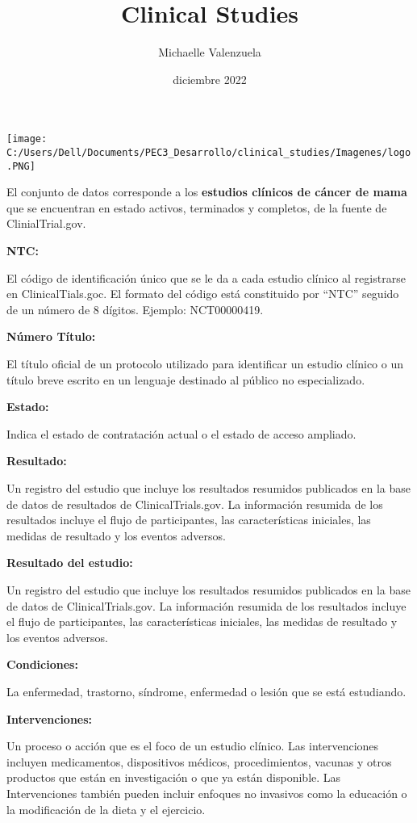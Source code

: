 \documentclass[
]{article}
\title{Clinical Studies}
\author{Michaelle Valenzuela}
\date{diciembre 2022}
\begin{document}
\maketitle

\texttt{[image: C:/Users/Dell/Documents/PEC3\_Desarrollo/clinical\_studies/Imagenes/logo.PNG]}

El conjunto de datos corresponde a los \textbf{estudios clínicos de
cáncer de mama} que se encuentran en estado activos, terminados y
completos, de la fuente de ClinialTrial.gov.

\textbf{NTC:}

El código de identificación único que se le da a cada estudio clínico al
registrarse en ClinicalTials.goc. El formato del código está constituido
por ``NTC'' seguido de un número de 8 dígitos. Ejemplo: NCT00000419.

\textbf{Número Título:}

El título oficial de un protocolo utilizado para identificar un estudio
clínico o un título breve escrito en un lenguaje destinado al público no
especializado.

\textbf{Estado:}

Indica el estado de contratación actual o el estado de acceso ampliado.

\textbf{Resultado:}

Un registro del estudio que incluye los resultados resumidos publicados
en la base de datos de resultados de ClinicalTrials.gov. La información
resumida de los resultados incluye el flujo de participantes, las
características iniciales, las medidas de resultado y los eventos
adversos.

\textbf{Resultado del estudio:}

Un registro del estudio que incluye los resultados resumidos publicados
en la base de datos de ClinicalTrials.gov. La información resumida de
los resultados incluye el flujo de participantes, las características
iniciales, las medidas de resultado y los eventos adversos.

\textbf{Condiciones:}

La enfermedad, trastorno, síndrome, enfermedad o lesión que se está
estudiando.

\textbf{Intervenciones:}

Un proceso o acción que es el foco de un estudio clínico. Las
intervenciones incluyen medicamentos, dispositivos médicos,
procedimientos, vacunas y otros productos que están en investigación o
que ya están disponible. Las Intervenciones también pueden incluir
enfoques no invasivos como la educación o la modificación de la dieta y
el ejercicio.
\end{document}
